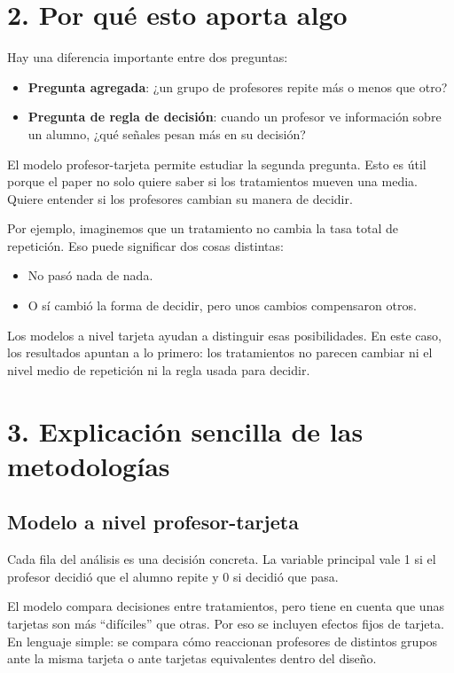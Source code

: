 \documentclass[12pt,a4paper]{article}
\begin{document}
\section*{2. Por qué esto aporta algo}

Hay una diferencia importante entre dos preguntas:

\begin{itemize}
  \item \textbf{Pregunta agregada}: ¿un grupo de profesores repite más o menos que otro?
  \item \textbf{Pregunta de regla de decisión}: cuando un profesor ve información sobre un alumno, ¿qué señales pesan más en su decisión?
\end{itemize}

El modelo profesor-tarjeta permite estudiar la segunda pregunta. Esto es útil porque el paper no solo quiere saber si los tratamientos mueven una media. Quiere entender si los profesores cambian su manera de decidir.

Por ejemplo, imaginemos que un tratamiento no cambia la tasa total de repetición. Eso puede significar dos cosas distintas:

\begin{itemize}
  \item No pasó nada de nada.
  \item O sí cambió la forma de decidir, pero unos cambios compensaron otros.
\end{itemize}

Los modelos a nivel tarjeta ayudan a distinguir esas posibilidades. En este caso, los resultados apuntan a lo primero: los tratamientos no parecen cambiar ni el nivel medio de repetición ni la regla usada para decidir.

\section*{3. Explicación sencilla de las metodologías}

\subsection*{Modelo a nivel profesor-tarjeta}

Cada fila del análisis es una decisión concreta. La variable principal vale 1 si el profesor decidió que el alumno repite y 0 si decidió que pasa.

El modelo compara decisiones entre tratamientos, pero tiene en cuenta que unas tarjetas son más ``difíciles'' que otras. Por eso se incluyen efectos fijos de tarjeta. En lenguaje simple: se compara cómo reaccionan profesores de distintos grupos ante la misma tarjeta o ante tarjetas equivalentes dentro del diseño.
\end{document}
